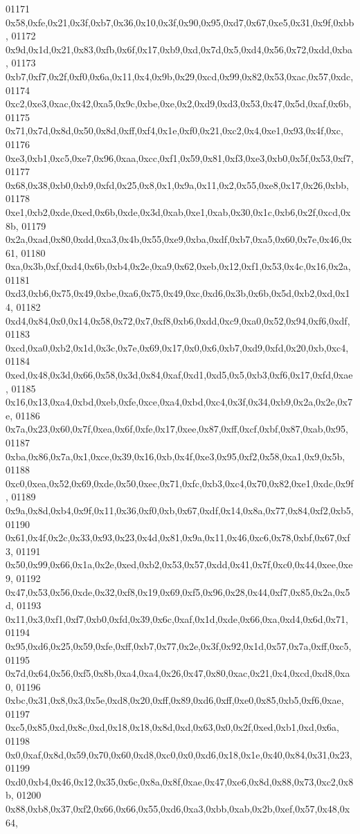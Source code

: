 \begin{DoxyCode}
01171   0x58,0xfe,0x21,0x3f,0xb7,0x36,0x10,0x3f,0x90,0x95,0xd7,0x67,0xe5,0x31,0x9f,0xbb,
01172   0x9d,0x1d,0x21,0x83,0xfb,0x6f,0x17,0xb9,0xd,0x7d,0x5,0xd4,0x56,0x72,0xdd,0xba,
01173   0xb7,0xf7,0x2f,0xf0,0x6a,0x11,0x4,0x9b,0x29,0xcd,0x99,0x82,0x53,0xac,0x57,0xdc,
01174   0xc2,0xe3,0xac,0x42,0xa5,0x9c,0xbe,0xe,0x2,0xd9,0xd3,0x53,0x47,0x5d,0xaf,0x6b,
01175   0x71,0x7d,0x8d,0x50,0x8d,0xff,0xf4,0x1e,0xf0,0x21,0xc2,0x4,0xe1,0x93,0x4f,0xc,
01176   0xe3,0xb1,0xc5,0xe7,0x96,0xaa,0xcc,0xf1,0x59,0x81,0xf3,0xe3,0xb0,0x5f,0x53,0xf7,
01177   0x68,0x38,0xb0,0xb9,0xfd,0x25,0x8,0x1,0x9a,0x11,0x2,0x55,0xe8,0x17,0x26,0xbb,
01178   0xe1,0xb2,0xde,0xed,0x6b,0xde,0x3d,0xab,0xe1,0xab,0x30,0x1c,0xb6,0x2f,0xcd,0x8b,
01179   0x2a,0xad,0x80,0xdd,0xa3,0x4b,0x55,0xe9,0xba,0xdf,0xb7,0xa5,0x60,0x7e,0x46,0x61,
01180   0xa,0x3b,0xf,0xd4,0x6b,0xb4,0x2e,0xa9,0x62,0xeb,0x12,0xf1,0x53,0x4c,0x16,0x2a,
01181   0xd3,0xb6,0x75,0x49,0xbe,0xa6,0x75,0x49,0xc,0xd6,0x3b,0x6b,0x5d,0xb2,0xd,0x14,
01182   0xd4,0x84,0x0,0x14,0x58,0x72,0x7,0xf8,0xb6,0xdd,0xc9,0xa0,0x52,0x94,0xf6,0xdf,
01183   0xcd,0xa0,0xb2,0x1d,0x3c,0x7e,0x69,0x17,0x0,0x6,0xb7,0xd9,0xfd,0x20,0xb,0xc4,
01184   0xed,0x48,0x3d,0x66,0x58,0x3d,0x84,0xaf,0xd1,0xd5,0x5,0xb3,0xf6,0x17,0xfd,0xae,
01185   0x16,0x13,0xa4,0xbd,0xeb,0xfe,0xce,0xa4,0xbd,0xc4,0x3f,0x34,0xb9,0x2a,0x2e,0x7e,
01186   0x7a,0x23,0x60,0x7f,0xea,0x6f,0xfe,0x17,0xee,0x87,0xff,0xcf,0xbf,0x87,0xab,0x95,
01187   0xba,0x86,0x7a,0x1,0xce,0x39,0x16,0xb,0x4f,0xe3,0x95,0xf2,0x58,0xa1,0x9,0x5b,
01188   0xc0,0xea,0x52,0x69,0xde,0x50,0xec,0x71,0xfc,0xb3,0xc4,0x70,0x82,0xe1,0xdc,0x9f,
01189   0x9a,0x8d,0xb4,0x9f,0x11,0x36,0xf0,0xb,0x67,0xdf,0x14,0x8a,0x77,0x84,0xf2,0xb5,
01190   0x61,0x4f,0x2c,0x33,0x93,0x23,0x4d,0x81,0x9a,0x11,0x46,0xc6,0x78,0xbf,0x67,0xf3,
01191   0x50,0x99,0x66,0x1a,0x2e,0xed,0xb2,0x53,0x57,0xdd,0x41,0x7f,0xc0,0x44,0xee,0xe9,
01192   0x47,0x53,0x56,0xde,0x32,0xf8,0x19,0x69,0xf5,0x96,0x28,0x44,0xf7,0x85,0x2a,0x5d,
01193   0x11,0x3,0xf1,0xf7,0xb0,0xfd,0x39,0x6c,0xaf,0x1d,0xde,0x66,0xa,0xd4,0x6d,0x71,
01194   0x95,0xd6,0x25,0x59,0xfe,0xff,0xb7,0x77,0x2e,0x3f,0x92,0x1d,0x57,0x7a,0xff,0xc5,
01195   0x7d,0x64,0x56,0xf5,0x8b,0xa4,0xa4,0x26,0x47,0x80,0xac,0x21,0x4,0xcd,0xd8,0xa0,
01196   0xbc,0x31,0x8,0x3,0x5e,0xd8,0x20,0xff,0x89,0xd6,0xff,0xe0,0x85,0xb5,0xf6,0xae,
01197   0xc5,0x85,0xd,0x8c,0xd,0x18,0x18,0x8d,0xd,0x63,0x0,0x2f,0xed,0xb1,0xd,0x6a,
01198   0x0,0xaf,0x8d,0x59,0x70,0x60,0xd8,0xc0,0x0,0xd6,0x18,0x1e,0x40,0x84,0x31,0x23,
01199   0xd0,0xb4,0x46,0x12,0x35,0x6c,0x8a,0x8f,0xae,0x47,0xe6,0x8d,0x88,0x73,0xc2,0x8b,
01200   0x88,0xb8,0x37,0xf2,0x66,0x66,0x55,0xd6,0xa3,0xbb,0xab,0x2b,0xef,0x57,0x48,0x64,

\end{DoxyCode}
